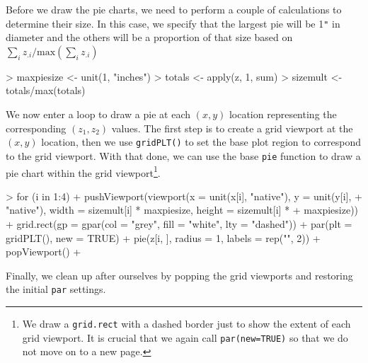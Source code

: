\documentclass[a4paper]{article}
\begin{document}
\begin{Schunk}
\end{Schunk}
Before we draw the pie charts, we need to perform a couple of
calculations to determine their size.  In this case, we specify that
the largest pie will be 1\verb|"| in diameter and the others will be 
a proportion of that size based on $\sum_i{z_{.i}} /
{}\left( \sum_i{z_{.i}} \right)$

\begin{Schunk}
\begin{Sinput}
> maxpiesize <- unit(1, "inches")
> totals <- apply(z, 1, sum)
> sizemult <- totals/max(totals)
\end{Sinput}
\end{Schunk}
We now enter a loop to draw a pie at each $(x, y)$ location
representing the corresponding $(z_1, z_2)$ values.  The first
step is to create a grid viewport at the $(x, y)$ location,
then we use \verb|gridPLT()|
to set the base plot region to correspond to the grid viewport.
With that done, we can use the base \verb|pie| function to draw a pie
chart within the grid viewport\footnote{We draw a {\tt grid.rect} 
with a dashed border just to show the extent of each grid viewport.
It is crucial that we again call {\tt par(new=TRUE)} so that
we do not move on to a new page.}.  

\begin{Schunk}
\begin{Sinput}
> for (i in 1:4) {
+     pushViewport(viewport(x = unit(x[i], "native"), y = unit(y[i], 
+         "native"), width = sizemult[i] * maxpiesize, height = sizemult[i] * 
+         maxpiesize))
+     grid.rect(gp = gpar(col = "grey", fill = "white", lty = "dashed"))
+     par(plt = gridPLT(), new = TRUE)
+     pie(z[i, ], radius = 1, labels = rep("", 2))
+     popViewport()
+ }
\end{Sinput}
\end{Schunk}
Finally, we clean up after ourselves by popping the grid viewports
and restoring the initial \verb|par| settings.
\end{document}
